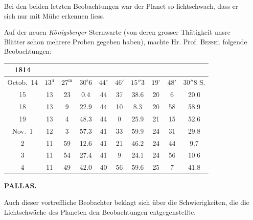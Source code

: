 \par\indent Bei den beiden letzten Beobachtungen war der Planet so lichtschwach, dass er sich nur mit
Mühe erkennen liess.

\par\indent Auf der neuen \emph{Königsberger} Sternwarte (von deren grosser Thätigkeit unsre Blätter
schon mehrere Proben gegeben haben), machte Hr. Prof. \textsc{Bessel} folgende
Beobachtungen:

\begin{center}\fontsize{9}{11}\selectfont\setlength{\tabcolsep}{3pt}\renewcommand{\arraystretch}{1.15}\begin{tabular}{c|ccc|ccc|ccc}
1814 &  &  &  \\
\hline
Octob.\ 14 & $13^{\mathrm u}$ & $27^{\mathrm m}$ & $30^{\mathrm s}6$ & $44^{\circ}$ & $46'$ & $15''3$ & $19^{\circ}$ & $48'$ & $30''8$ S. \\
15         & 13 & 23 & 0.4  & 44 & 37 & 38.6 & 20 & 6  & 20.0 \\
18         & 13 & 9  & 22.9 & 44 & 10 & 8.3  & 20 & 58 & 58.9 \\
19         & 13 & 4  & 48.3 & 44 & 0  & 25.9 & 21 & 15 & 52.6 \\
Nov.\ 1    & 12 & 3  & 57.3 & 41 & 33 & 59.9 & 24 & 31 & 29.8 \\
2          & 11 & 59 & 12.6 & 41 & 21 & 46.2 & 24 & 44 & 9.7  \\
3          & 11 & 54 & 27.4 & 41 & 9  & 24.1 & 24 & 56 & $10\;6$ \\
4          & 11 & 49 & 42.0 & 40 & 56 & 59.6 & 25 & 7  & 41.8 \\
\end{tabular}\end{center}

\clearpage
\thispagestyle{empty}
\noindent{}%
\makebox[12mm][l]{}%
\parbox[t]{\dimexpr\linewidth-24mm\relax}{\centering\footnotesize\bfseries PALLAS.\par}%
\par\nobreak\medskip
\par\indent Auch dieser vortreffliche Beobachter beklagt sich über die Schwierigkeiten, die die Lichtschwäche des Planeten den Beobachtungen entgegenstellte.

